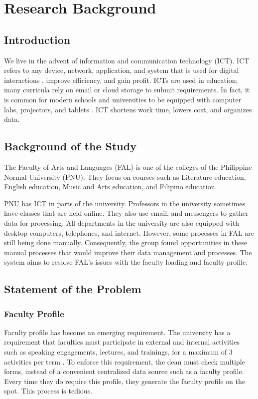 \chapter{Research Background}

\section{Introduction}
We live in the advent of information and communication technology (ICT). ICT refers to any device, network, application, and system that is used for digital interactions \cite{ref:WhatAreICTs}, improve efficiency, and gain profit. ICTs are used in education; many curricula rely on email or cloud storage to submit requirements. In fact, it is common for modern schools and universities to be equipped with computer labs, projectors, and tablets \cite{ref:ICTinEducation}. ICT shortens work time, lowers cost, and organizes data. 

\section{Background of the Study}
The Faculty of Arts and Languages (FAL) is one of the colleges of the Philippine Normal University (PNU). They focus on courses such as Literature education, English education, Music and Arts education, and Filipino education. 

PNU has ICT in parts of the university. Professors in the university sometimes have classes that are held online. They also use email, and messengers to gather data for processing. All departments in the university are also equipped with desktop computers, telephones, and internet. However, some processes in FAL are still being done manually. Consequently, the group found opportunities in these manual processes that would improve their data management and processes. The system aims to resolve FAL's issues with the faculty loading and faculty profile.

\section{Statement of the Problem}

\subsection{Faculty Profile}
Faculty profile has become an emerging requirement. The university has a requirement that faculties must participate in external and internal activities such as speaking engagements, lectures, and trainings, for a maximum of 3 activities per term . To enforce this requirement, the dean must check multiple forms, instead of a convenient centralized data source such as a faculty profile. Every time they do require this profile, they generate the faculty profile on the spot. This process is tedious.


